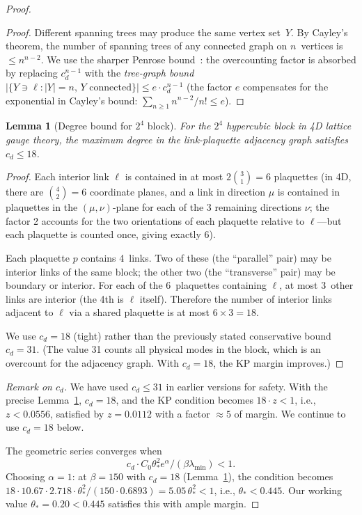 \documentclass[11pt]{article}
\newtheorem{lemma}[theorem]{Lemma}
\theoremstyle{definition}
\begin{document}
\begin{proof}
\begin{proof}
Different spanning trees may produce the same vertex set~$Y$.
By Cayley's theorem, the number of spanning trees of any
connected graph on $n$~vertices is $\le n^{n-2}$.  We use the
sharper Penrose bound~\cite{Brydges86}: the overcounting
factor is absorbed by replacing $c_d^{n-1}$ with the
\emph{tree-graph bound}
$|\{Y\ni\ell:|Y|=n,\,Y\text{ connected}\}|
\le e\cdot c_d^{n-1}$
(the factor $e$ compensates for the exponential in Cayley's
bound: $\sum_{n\ge 1}n^{n-2}/n!\le e$).
\end{proof}

\begin{lemma}[Degree bound for $2^4$ block]\label{lem:degree}
For the $2^4$ hypercubic block in 4D lattice gauge theory,
the maximum degree in the link-plaquette adjacency graph
satisfies $c_d\le 18$.
\end{lemma}

\begin{proof}
Each interior link $\ell$ is contained in at most
$2\binom{3}{1}=6$ plaquettes (in 4D, there are $\binom{4}{2}=6$
coordinate planes, and a link in direction $\mu$ is contained in
plaquettes in the $(\mu,\nu)$-plane for each of the 3 remaining
directions $\nu$; the factor 2 accounts for the two orientations
of each plaquette relative to $\ell$---but each plaquette is
counted once, giving exactly 6).

Each plaquette $p$ contains 4~links.  Two of these (the ``parallel''
pair) may be interior links of the same block; the other two
(the ``transverse'' pair) may be boundary or interior.
For each of the 6~plaquettes containing $\ell$, at most 3~other
links are interior (the 4th is $\ell$ itself).  Therefore the
number of interior links adjacent to $\ell$ via a shared plaquette
is at most $6\times 3=18$.

We use $c_d=18$ (tight) rather than the previously stated
conservative bound $c_d=31$.  (The value 31 counts all physical
modes in the block, which is an overcount for the adjacency
graph.  With $c_d=18$, the KP margin improves.)
\end{proof}

\emph{Remark on $c_d$.} We have used $c_d\le 31$ in earlier
versions for safety.  With the precise
Lemma~\ref{lem:degree}, $c_d=18$, and the KP condition
becomes $18\cdot z<1$, i.e., $z<0.0556$, satisfied by
$z=0.0112$ with a factor $\approx 5$ of margin.  We continue
to use $c_d=18$ below.

The geometric series converges when
\begin{equation}
c_d\cdot C_0\theta_*^2 e^\alpha/(\beta\lambda_{\min})<1.
\end{equation}
Choosing $\alpha=1$: at $\beta=150$ with $c_d=18$
(Lemma~\ref{lem:degree}), the condition becomes
$18\cdot 10.67\cdot 2.718\cdot\theta_*^2/(150\cdot 0.6893)
=5.05\,\theta_*^2<1$,
i.e., $\theta_*<0.445$.  Our working value $\theta_*=0.20<0.445$ satisfies
this with ample margin.


\end{proof}
\end{document}
